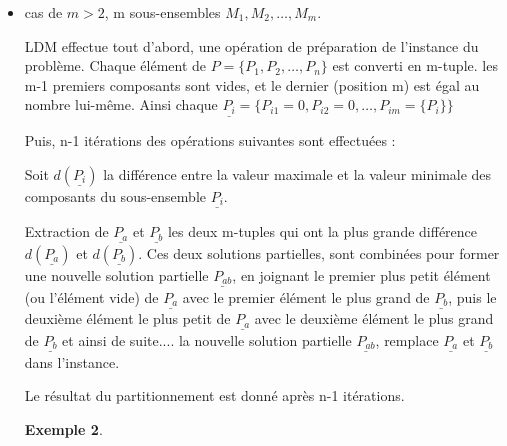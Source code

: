 \documentclass[a4paper,12pt]{report}
\theoremstyle{plain}				%
\newtheorem{example}{Exemple}
\theoremstyle{definition}				%
\begin{document}
\begin{itemize}
\begin{example}
figure \ref{fig:LDM2M}

\end{example}

\bigskip

\item cas de $m>2$, m sous-ensembles $M_1,M_2, \ldots, M_m $.

%
%
LDM effectue tout d'abord, une opération de préparation de l'instance du problème. Chaque élément de $P = \{ P_1, P_2, \ldots, P_n \}$ est converti en m-tuple. les m-1 premiers composants sont vides, et le dernier (position m) est égal au nombre lui-même. Ainsi chaque $\underline{P_i} = \{P_{i 1}=0,P_{i 2}=0, \ldots, P_{i m}=\{P_i\} \}$

Puis, n-1 itérations des opérations suivantes sont effectuées :


Soit $d(\underline{P_i})$ la différence entre la valeur maximale et la valeur minimale des composants du sous-ensemble $\underline{P_i}$.

Extraction de $\underline{P_a}$ et $\underline{P_b}$ les deux m-tuples qui ont la plus grande différence $d(\underline{P_a})$ et $d(\underline{P_b})$. Ces deux solutions partielles, sont combinées pour former une nouvelle solution partielle $\underline{P_{ab}}$, en joignant le premier plus petit élément (ou l'élément vide) de $\underline{P_a}$ avec le premier élément le plus grand de $\underline{P_b}$, puis le deuxième élément le plus petit de $\underline{P_a}$ avec le deuxième élément le plus grand de $\underline{P_b}$ et ainsi de suite.... la nouvelle solution partielle $\underline{P_{ab}}$, remplace $\underline{P_a}$ et $\underline{P_b}$ dans l'instance.

Le résultat du partitionnement est donné après n-1 itérations.


\begin{example}


\end{example}
\end{itemize}
\end{document}
